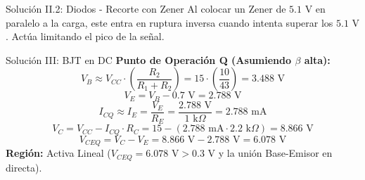 \documentclass[aspectratio=169]{beamer}
\begin{document}
\begin{frame}{Solución II.2: Diodos - Recorte con Zener}
    Al colocar un Zener de $5.1\text{ V}$ en paralelo a la carga, este entra en ruptura inversa cuando intenta superar los $5.1\text{ V}$. Actúa limitando el pico de la señal.
    
    \vspace{0.1cm}
    \begin{center}
    \end{center}
\end{frame}

\begin{frame}{Solución III: BJT en DC}
    \textbf{Punto de Operación Q (Asumiendo $\beta$ alta):}
    $$V_B \approx V_{CC} \cdot \left( \frac{R_2}{R_1 + R_2} \right) = 15 \cdot \left( \frac{10}{43} \right) = 3.488\text{ V}$$
    $$V_E = V_B - 0.7\text{ V} = 2.788\text{ V}$$
    $$I_{CQ} \approx I_E = \frac{V_E}{R_E} = \frac{2.788\text{ V}}{1\text{ k}\Omega} = 2.788\text{ mA}$$
    $$V_C = V_{CC} - I_{CQ} \cdot R_C = 15 - (2.788\text{ mA} \cdot 2.2\text{ k}\Omega) = 8.866\text{ V}$$
    $$V_{CEQ} = V_C - V_E = 8.866\text{ V} - 2.788\text{ V} = 6.078\text{ V}$$
    \vspace{0.2cm}
    \textbf{Región:} Activa Lineal ($V_{CEQ} = 6.078\text{ V} > 0.3\text{ V}$ y la unión Base-Emisor en directa).
\end{frame}
\end{document}
